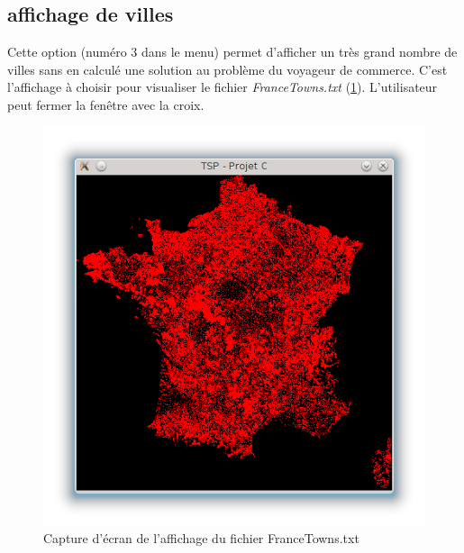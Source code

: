 \documentclass[a4paper,11pt]{article}
\begin{document}
\subsection{affichage de villes}
Cette option (numéro 3 dans le menu) permet d'afficher un très grand nombre de villes sans en calculé une solution au problème du voyageur de commerce. C'est l'affichage à choisir pour visualiser le fichier \textit{FranceTowns.txt} (\ref{fig1}). L'utilisateur peut fermer la fenêtre avec la croix.
\begin{center}
\begin{figure}[htbp]
\begin{center}
\includegraphics[scale=0.3]{france.png}
\caption{Capture d'écran de l'affichage du fichier FranceTowns.txt}
\label{fig1}
\end{center}
\end{figure}
\end{center}
\end{document}
